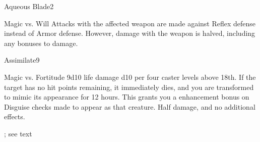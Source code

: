 \begin{spellsection}{Aqueous Blade}{2}
\begin{spellheader}
\end{spellheader}
\begin{spellcontent}
    \begin{spelltargetinginfo}
    \end{spelltargetinginfo}
    \begin{spelleffects}
        \begin{spellattack}{Magic vs. Will}
            \spellsuccess Attacks with the affected weapon are made against Reflex defense instead of Armor defense. However, damage with the weapon is halved, including any bonuses to damage.
        \end{spellattack}
        \spelldur \durshort
    \end{spelleffects}
\end{spellcontent}
\begin{spellfooter}
\end{spellfooter}
\end{spellsection}

\begin{spellsection}{Assimilate}{9}
\begin{spellheader}
\end{spellheader}
\begin{spellcontent}
    \begin{spelltargetinginfo}
    \end{spelltargetinginfo}
    \begin{spelleffects}
        \begin{spellattack}{Magic vs. Fortitude}
            \spellsuccess 9d10 life damage \add d10 per four caster levels above 18th. If the target has no hit points remaining, it immediately dies, and you are transformed to mimic its appearance for 12 hours. This grants you a  enhancement bonus on Disguise checks made to appear as that creature.
            \spellfailure Half damage, and no additional effects.
        \end{spellattack}
        \spelldur \durext; see text
    \end{spelleffects}
\end{spellcontent}
\begin{spellfooter}
\end{spellfooter}
\end{spellsection}


